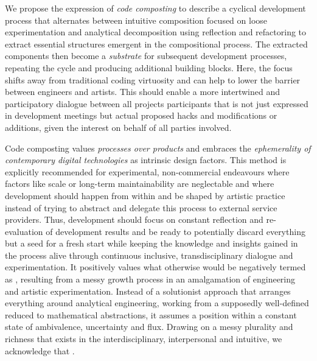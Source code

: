 We propose the expression of \emph{code composting} to describe a cyclical development process that alternates between intuitive composition focused on loose experimentation and analytical decomposition using reflection and refactoring to extract essential structures emergent in the compositional process.
The extracted components then become a \emph{substrate} for subsequent development processes, repeating the cycle and producing additional building blocks.
Here, the focus shifts away from traditional coding virtuosity and can help to lower the barrier between engineers and artists.
This should enable a more intertwined and participatory dialogue between all project\textquotesingle s participants that is not just expressed in development meetings but actual proposed hacks and modifications or additions, given the interest on behalf of all parties involved.

Code composting values \emph{processes over products} and embraces the \emph{ephemerality of contemporary digital technologies} as intrinsic design factors.
This method is explicitly recommended for experimental, non-commercial endeavours where factors like scale or long-term maintainability are neglectable and where development should happen from within and be shaped by artistic practice instead of trying to abstract and delegate this process to external service providers.
Thus, development should focus on constant reflection and re-evaluation of development results and be ready to potentially discard everything but a seed for a fresh start while keeping the knowledge and insights gained in the process alive through continuous inclusive, transdisciplinary dialogue and experimentation.
It positively values what otherwise would be negatively termed as , resulting from a messy growth process in an amalgamation of engineering and artistic experimentation.
Instead of a solutionist approach that arranges everything around analytical engineering, working from a supposedly well-defined  reduced to mathematical abstractions, it assumes a position within a constant state of ambivalence, uncertainty and flux.
Drawing on a messy plurality and richness that exists in the interdisciplinary, interpersonal and intuitive, we acknowledge that \parencite[][55]{harawayStayingWithTheTrouble}.
